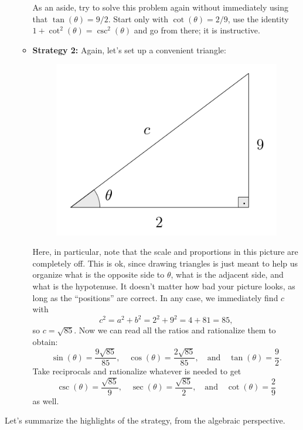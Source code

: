 \documentclass{ximera}
\begin{document}
\begin{example}
\begin{enumerate}[label=\alph*.]
\begin{explanation}
\begin{itemize}
        As an aside, try to solve this problem again without immediately using that $\tan(\theta)=9/2$. Start only with $\cot(\theta) =2/9$, use the identity $1+\cot^2(\theta)=\csc^2(\theta)$ and go from there; it is instructive.
      \item {\bf Strategy 2:} Again, let's set up a convenient triangle: \begin{figure}[h]
          \centering
          \includegraphics[scale=.3]{./figures/9-1-3-triangle-cot-2-9.png}
        \end{figure} Here, in particular, note that the scale and proportions in this picture are completely off. This is ok, since drawing triangles is just meant to help us organize what is the opposite side to $\theta$, what is the adjacent side, and what is the hypotenuse. It doesn't matter how bad your picture looks, as long as the ``positions'' are correct. In any case, we immediately find $c$ with $$c^2=a^2+b^2=2^2+9^2 = 4+81=85,$$so $c=\sqrt{85}$. Now we can read all the ratios and rationalize them to obtain: $$\sin(\theta)=\frac{9\sqrt{85}}{85},\quad\cos(\theta)=\frac{2\sqrt{85}}{85},\quad\mbox{and}\quad\tan(\theta)=\frac{9}{2}.$$Take reciprocals and rationalize whatever is needed to get $$\csc(\theta)=\frac{\sqrt{85}}{9},\quad\sec(\theta)=\frac{\sqrt{85}}{2},\quad\mbox{and}\quad\cot(\theta)=\frac{2}{9}$$as well.
      \end{itemize}
    \end{explanation}
  \end{enumerate}
\end{example}

Let's summarize the highlights of the strategy, from the algebraic perspective.
\end{document}
